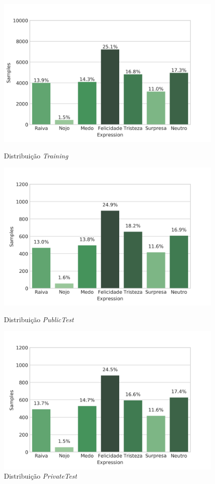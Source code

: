\begin{figure}[!htb]
  \includegraphics[width=\linewidth]{images/expression_distribution_training.png}
  \caption{Distribuição \emph{Training}}
  \label{fig:datasetTraining}
\endminipage\hfill
{}
  \includegraphics[width=\linewidth]{images/expression_distribution_validation.png}
  \caption{Distribuição \emph{PublicTest}}
  \label{fig:datasetValidation}
\endminipage\hfill
{}%
  \includegraphics[width=\linewidth]{images/expression_distribution_test.png}
  \caption{Distribuição \emph{PrivateTest}}
  \label{fig:datasetTest}
\endminipage
\end{figure}

